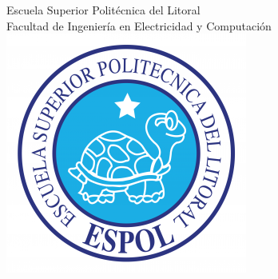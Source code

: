 \documentclass[10pt]{article}
\begin{document}
{\centering
{\Large{Escuela Superior Polit\'ecnica del Litoral\\Facultad de Ingenier\'ia en Electricidad y Computaci\'on\\}}
\vspace{0.6in}
\includegraphics[scale=0.5]{espol.png}\\
\vspace{0.8in}
{\LARGE \textbf{}\\
\vspace{0.5in}

\newpage
\tableofcontents

\newpage
\begin{flushleft}

\end{flushleft}}}
\end{document}
